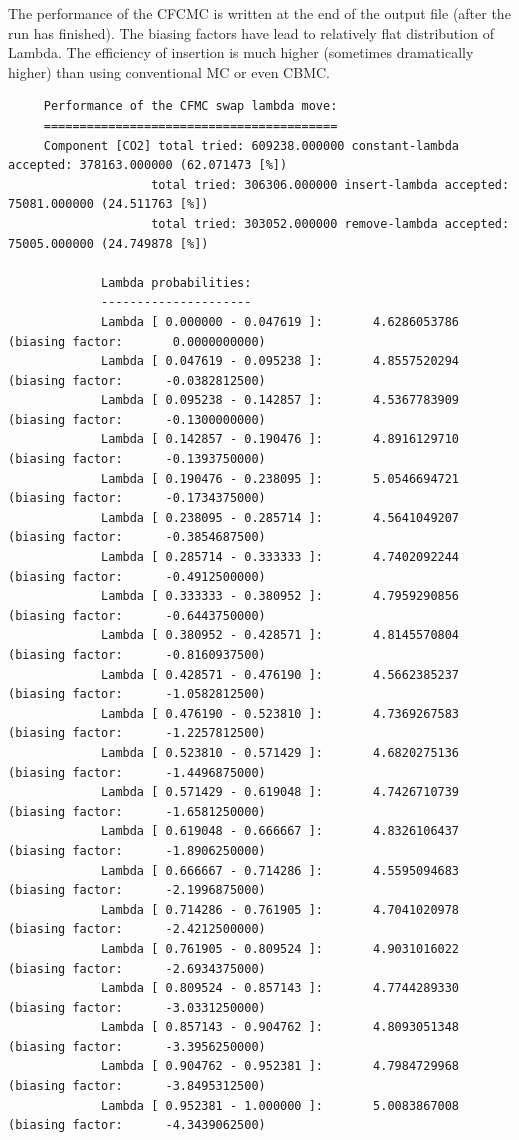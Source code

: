 The performance of the CFCMC is written at the end of the output file (after the run has finished).
The biasing factors have lead to relatively flat distribution of Lambda. The efficiency of insertion is
much higher (sometimes dramatically higher) than using conventional MC or even CBMC.

\begin{tiny}
\begin{verbatim}
     Performance of the CFMC swap lambda move:
     =========================================
     Component [CO2] total tried: 609238.000000 constant-lambda accepted: 378163.000000 (62.071473 [%])
                    total tried: 306306.000000 insert-lambda accepted: 75081.000000 (24.511763 [%])
                    total tried: 303052.000000 remove-lambda accepted: 75005.000000 (24.749878 [%])
     
             Lambda probabilities:
             ---------------------
             Lambda [ 0.000000 - 0.047619 ]:       4.6286053786 (biasing factor:       0.0000000000)
             Lambda [ 0.047619 - 0.095238 ]:       4.8557520294 (biasing factor:      -0.0382812500)
             Lambda [ 0.095238 - 0.142857 ]:       4.5367783909 (biasing factor:      -0.1300000000)
             Lambda [ 0.142857 - 0.190476 ]:       4.8916129710 (biasing factor:      -0.1393750000)
             Lambda [ 0.190476 - 0.238095 ]:       5.0546694721 (biasing factor:      -0.1734375000)
             Lambda [ 0.238095 - 0.285714 ]:       4.5641049207 (biasing factor:      -0.3854687500)
             Lambda [ 0.285714 - 0.333333 ]:       4.7402092244 (biasing factor:      -0.4912500000)
             Lambda [ 0.333333 - 0.380952 ]:       4.7959290856 (biasing factor:      -0.6443750000)
             Lambda [ 0.380952 - 0.428571 ]:       4.8145570804 (biasing factor:      -0.8160937500)
             Lambda [ 0.428571 - 0.476190 ]:       4.5662385237 (biasing factor:      -1.0582812500)
             Lambda [ 0.476190 - 0.523810 ]:       4.7369267583 (biasing factor:      -1.2257812500)
             Lambda [ 0.523810 - 0.571429 ]:       4.6820275136 (biasing factor:      -1.4496875000)
             Lambda [ 0.571429 - 0.619048 ]:       4.7426710739 (biasing factor:      -1.6581250000)
             Lambda [ 0.619048 - 0.666667 ]:       4.8326106437 (biasing factor:      -1.8906250000)
             Lambda [ 0.666667 - 0.714286 ]:       4.5595094683 (biasing factor:      -2.1996875000)
             Lambda [ 0.714286 - 0.761905 ]:       4.7041020978 (biasing factor:      -2.4212500000)
             Lambda [ 0.761905 - 0.809524 ]:       4.9031016022 (biasing factor:      -2.6934375000)
             Lambda [ 0.809524 - 0.857143 ]:       4.7744289330 (biasing factor:      -3.0331250000)
             Lambda [ 0.857143 - 0.904762 ]:       4.8093051348 (biasing factor:      -3.3956250000)
             Lambda [ 0.904762 - 0.952381 ]:       4.7984729968 (biasing factor:      -3.8495312500)
             Lambda [ 0.952381 - 1.000000 ]:       5.0083867008 (biasing factor:      -4.3439062500)
     

\end{verbatim}
\end{tiny}
